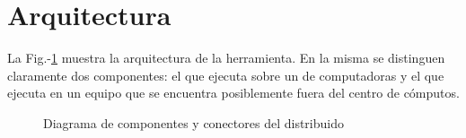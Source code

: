 \section{Arquitectura}

\newcommand{\fig}{Fig.-}

La \fig\ref{fig:arquitectura} muestra la arquitectura de la herramienta. En
la misma se distinguen claramente dos componentes: el \bend que ejecuta sobre
un \cluster de computadoras y el \fend que ejecuta en un equipo que se
encuentra posiblemente fuera del centro de cómputos.

\begin{figure}
\caption{Diagrama de componentes y conectores del \ssolver distribuido}
\label{fig:arquitectura}
\end{figure}

